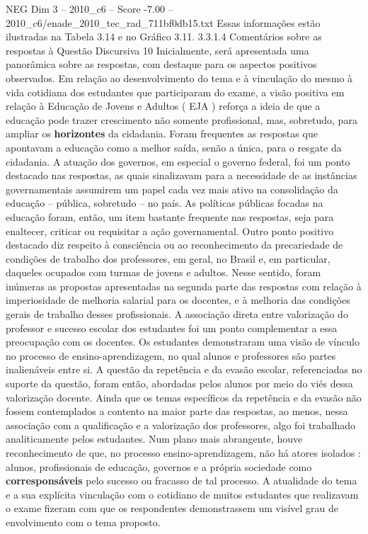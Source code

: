 \begin{textsample}{NEG Dim 3 – 2010\_c6 – Score -7.00 – 2010\_c6/enade\_2010\_tec\_rad\_711bf0db15.txt}
Essas informações estão ilustradas na Tabela 3.14 e no Gráfico 3.11. 3.3.1.4 Comentários sobre as respostas à Questão Discursiva 10 Inicialmente, será apresentada uma panorâmica sobre as respostas, com destaque para os aspectos positivos observados.
Em relação ao desenvolvimento do tema e à vinculação do mesmo à vida cotidiana dos estudantes que participaram do exame, a visão positiva em relação à Educação de Jovens e Adultos ( EJA ) reforça a ideia de que a educação pode trazer crescimento não somente profissional, mas, sobretudo, para ampliar os \textbf{horizontes} da cidadania.
Foram frequentes as respostas que apontavam a educação como a melhor saída, senão a única, para o resgate da cidadania.
A atuação dos governos, em especial o governo federal, foi um ponto destacado nas respostas, as quais sinalizavam para a necessidade de as instâncias governamentais assumirem um papel cada vez mais ativo na consolidação da educação – pública, sobretudo – no país.
As políticas públicas focadas na educação foram, então, um item bastante frequente nas respostas, seja para enaltecer, criticar ou requisitar a ação governamental.
Outro ponto positivo destacado diz respeito à consciência ou ao reconhecimento da precariedade de condições de trabalho dos professores, em geral, no Brasil e, em particular, daqueles ocupados com turmas de jovens e adultos.
Nesse sentido, foram inúmeras as propostas apresentadas na segunda parte das respostas com relação à imperiosidade de melhoria salarial para os docentes, e à melhoria das condições gerais de trabalho desses profissionais.
A associação direta entre valorização do professor e sucesso escolar dos estudantes foi um ponto complementar a essa preocupação com os docentes.
Os estudantes demonstraram uma visão de vínculo no processo de ensino-aprendizagem, no qual alunos e professores são partes inalienáveis entre si.
A questão da repetência e da evasão escolar, referenciadas no suporte da questão, foram então, abordadas pelos alunos por meio do viés dessa valorização docente.
Ainda que os temas específicos da repetência e da evasão não fossem contemplados a contento na maior parte das respostas, ao menos, nessa associação com a qualificação e a valorização dos professores, algo foi trabalhado analiticamente pelos estudantes.
Num plano mais abrangente, houve reconhecimento de que, no processo ensino-aprendizagem, não há atores isolados : alunos, profissionais de educação, governos e a própria sociedade como \textbf{corresponsáveis} pelo sucesso ou fracasso de tal processo.
A atualidade do tema e a sua explícita vinculação com o cotidiano de muitos estudantes que realizavam o exame fizeram com que os respondentes demonstrassem um visível grau de envolvimento com o tema proposto.

\end{textsample}
